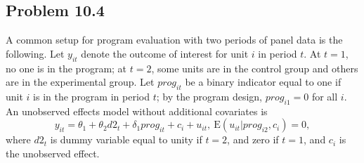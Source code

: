 \documentclass[10pt]{article}
\newcommand{\E}{\text{E}}
\begin{document}
\subsection*{Problem 10.4}
A common setup for program evaluation with two periods of panel data is the following. Let $y_{it}$ denote the outcome of interest for unit $i$ in period $t$. At $t=1$, no one is in the program; at $t=2$, some units are in the control group and others are in the experimental group. Let $prog_{it}$ be a binary indicator equal to one if unit $i$ is in the program in period $t$; by the program design, $prog_{i1}=0$ for all $i$. An unobserved effects model without additional covariates is
\[y_{it}=\theta_1+\theta_2d2_t+\delta_1prog_{it}+c_i+u_{it},\ \E(u_{it}|prog_{i2},c_i)=0,\]
where $d2_t$ is dummy variable equal to unity if $t=2$, and zero if $t=1$, and $c_i$ is the unobserved effect. 
\end{document}
